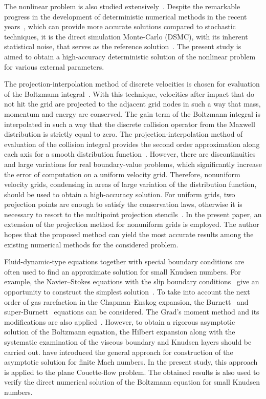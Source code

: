\documentclass[review]{elsarticle}
\begin{document}
The nonlinear problem is also studied extensively~\citep{Garzo2003}.
Despite the remarkable progress in the development of deterministic numerical methods
in the recent years~\citep[see e.g.][]{Dimarco2014,Mieussens2014},
which can provide more accurate solutions compared to stochastic techniques,
it is the direct simulation Monte-Carlo (DSMC), with its inherent statistical noise,
that serves as the reference solution~\citep[see e.g.][]{Cercignani1994,Struchtrup2009,Agrawal2014}.
The present study is aimed to obtain a high-accuracy deterministic solution
of the nonlinear problem for various external parameters.

The projection-interpolation method of discrete velocities is chosen for
evaluation of the Boltzmann integral~\citep{Tcheremissine1998, Tcheremissine2006}.
With this technique, velocities after impact that do not hit the grid
are projected to the adjacent grid nodes in such a way that mass, momentum and energy are conserved.
The gain term of the Boltzmann integral is interpolated in such a way that
the discrete collision operator from the Maxwell distribution is strictly equal to zero.
The projection-interpolation method of evaluation of the collision integral
provides the second order approximation along each axis for a smooth distribution function~\citep{Anikin2012}.
However, there are discontinuities and large variations for real boundary-value problems,
which significantly increase the error of computation on a uniform velocity grid.
Therefore, nonuniform velocity grids, condensing in areas of large variation
of the distribution function, should be used to obtain a high-accuracy solution.
For uniform grids, two projection points are enough to satisfy the conservation laws,
otherwise it is necessary to resort to the multipoint projection stencils~\citep{Dodulad2012}.
In the present paper, an extension of the projection method for nonuniform grids is employed.
The author hopes that the proposed method can yield the most accurate results
among the existing numerical methods for the considered problem.

Fluid-dynamic-type equations together with special boundary conditions
are often used to find an approximate solution for small Knudsen numbers.
For example, the Navier--Stokes equations with the slip boundary conditions~\citep{Ohwada1989a}
give an opportunity to construct the simplest solution~\citep{Sharipov2000}.
To take into account the next order of gas rarefaction in the Chapman--Enskog expansion,
the Burnett~\citep{Reese2003} and super-Burnett~\citep{Agrawal2014} equations can be considered.
The Grad's moment method and its modifications are also applied~\citep{Struchtrup2009}.
However, to obtain a rigorous asymptotic solution of the Boltzmann equation,
the Hilbert expansion along with the systematic examination of the viscous boundary and Knudsen layers
should be carried out. \citet{Sone2000} have introduced the general approach
for construction of the asymptotic solution for finite Mach numbers.
In the present study, this approach is applied to the plane Couette-flow problem.
The obtained results is also used to verify the direct numerical solution
of the Boltzmann equation for small Knudsen numbers.
\end{document}
